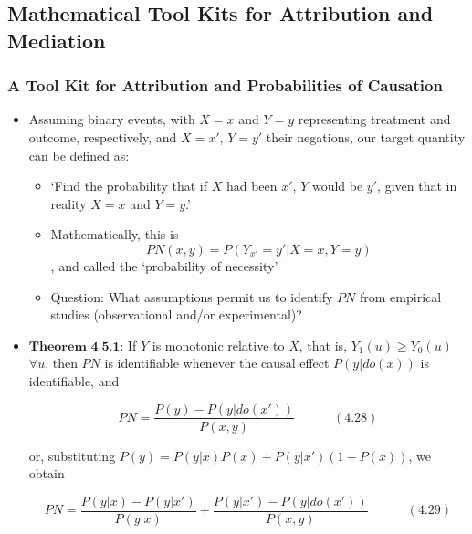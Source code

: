 \documentclass[]{article}
\providecommand{\tightlist}{%
  \setlength{\itemsep}{0pt}\setlength{\parskip}{0pt}}
\begin{document}
\subsection{Mathematical Tool Kits for Attribution and
Mediation}\label{mathematical-tool-kits-for-attribution-and-mediation}

\subsubsection{A Tool Kit for Attribution and Probabilities of
Causation}\label{a-tool-kit-for-attribution-and-probabilities-of-causation}

\begin{itemize}
\item
  Assuming binary events, with \(X = x\) and \(Y = y\) representing
  treatment and outcome, respectively, and \(X = x'\), \(Y = y'\) their
  negations, our target quantity can be defined as:

  \begin{itemize}
  \tightlist
  \item
    `Find the probability that if \(X\) had been \(x'\), \(Y\) would be
    \(y'\), given that in reality \(X = x\) and \(Y = y\).'
  \item
    Mathematically, this is \[PN(x,y) = P(Y_{x'} = y' | X = x, Y = y)\],
    and called the `probability of necessity'
  \item
    Question: What assumptions permit us to identify \(PN\) from
    empirical studies (observational and/or experimental)?
  \end{itemize}
\item
  \(\textbf{Theorem 4.5.1}\): If \(Y\) is monotonic relative to \(X\),
  that is, \(Y_1(u) \geq Y_0(u)\) \(\forall u\), then \(PN\) is
  identifiable whenever the causal effect \(P(y|do(x))\) is
  identifiable, and

  \begin{equation}
  PN = \frac{P(y) - P(y|do(x'))}{P(x,y)} \quad \quad \quad (4.28)
  \end{equation}

  or, substituting \(P(y) = P(y|x)P(x) + P(y|x')(1 - P(x))\), we obtain

  \begin{equation}
  PN = \frac{P(y|x) - P(y|x')}{P(y|x)} + \frac{P(y|x') - P(y|do(x'))}{P(x,y)} \quad \quad \quad (4.29)
  \end{equation}


\end{itemize}
\end{document}
